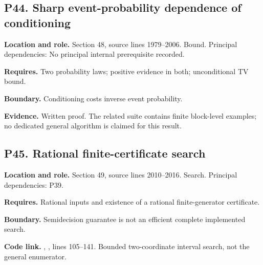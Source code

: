 \documentclass[11pt,oneside,openany]{book}
\numberwithin{equation}{section}
\begin{document}
\par\noindent\begin{minipage}{\textwidth}
\subsection{P44. Sharp event-probability dependence of
conditioning}\label{LSMRegister:p44.-sharp-event-probability-dependence-of-conditioning}

\textbf{Location and role.} Section 48, source lines 1979--2006. Bound.
Principal dependencies: No principal internal prerequisite recorded.

\textbf{Requires.} Two probability laws; positive evidence in both;
unconditional TV bound.

\textbf{Boundary.} Conditioning costs inverse event probability.

\textbf{Evidence.} Written proof. The related suite contains finite
block-level examples; no dedicated general algorithm is claimed for this
result.
\end{minipage}\par\medskip

\par\noindent\begin{minipage}{\textwidth}
\subsection{P45. Rational finite-certificate
search}\label{LSMRegister:p45.-rational-finite-certificate-search}

\textbf{Location and role.} Section 49, source lines 2010--2016. Search.
Principal dependencies: P39.

\textbf{Requires.} Rational inputs and existence of a rational
finite-generator certificate.

\textbf{Boundary.} Semidecision guarantee is not an efficient complete
implemented search.

\textbf{Code link.} ,
, lines 105--141. Bounded two-coordinate
interval search, not the general enumerator.
\end{minipage}\par\medskip
\end{document}

